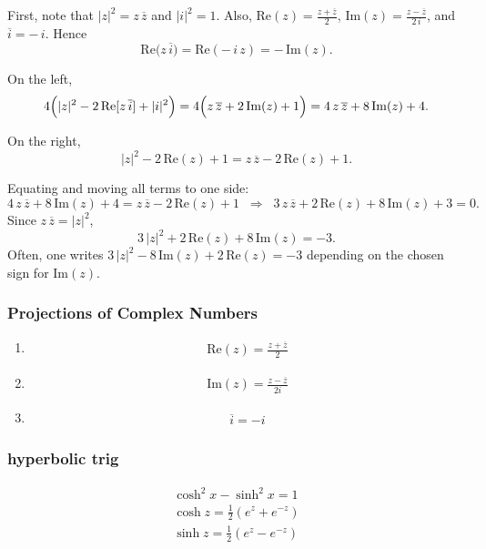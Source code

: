 \documentclass[9pt]{article}
\theoremstyle{definition} %
\theoremstyle{plain} %
\begin{document}
First, note that $\lvert z\rvert^{2} = z\,\overline{z}$ and $\lvert i\rvert^{2} = 1$.  
Also, $\mathrm{Re}(z) = \frac{z + \overline{z}}{2}$, $\mathrm{Im}(z) = \frac{z - \overline{z}}{2\,i}$, and $\overline{i} = -\,i$.  
Hence 
\[
\mathrm{Re}\bigl(z\,\overline{i}\bigr) 
= 
\mathrm{Re}(-\,i\,z) 
= 
-\,\mathrm{Im}(z).
\]

On the left, 
\[
4\Bigl(\lvert z\rvert^{2} - 2\,\mathrm{Re}[z\,\overline{i}] + \lvert i\rvert^{2}\Bigr)
=
4\Bigl(z\,\overline{z} + 2\,\mathrm{Im}(z) + 1\Bigr)
=
4\,z\,\overline{z} + 8\,\mathrm{Im}(z) + 4.
\]

On the right, 
\[
\lvert z\rvert^{2} - 2\,\mathrm{Re}(z) + 1
=
z\,\overline{z} - 2\,\mathrm{Re}(z) + 1.
\]

Equating and moving all terms to one side:
\[
4\,z\,\overline{z} + 8\,\mathrm{Im}(z) + 4
=
z\,\overline{z} - 2\,\mathrm{Re}(z) + 1
\;\;\Longrightarrow\;\;
3\,z\,\overline{z} + 2\,\mathrm{Re}(z) + 8\,\mathrm{Im}(z) + 3 
= 
0.
\]
Since $z\,\overline{z} = \lvert z\rvert^{2}$,
\[
3\,\lvert z\rvert^{2} + 2\,\mathrm{Re}(z) + 8\,\mathrm{Im}(z) = -3.
\]
Often, one writes
\(
3\,\lvert z\rvert^{2} - 8\,\mathrm{Im}(z) + 2\,\mathrm{Re}(z) = -3
\)
depending on the chosen sign for $\mathrm{Im}(z)$.
\subsubsection*{Projections of Complex Numbers}
\noindent
\begin{enumerate}
    \item \begin{align}
        \text{Re}(z) = \frac{z+\overline{z} }{2}
    \end{align}
    \item \begin{align}
        \text{Im} (z)= \frac{z-\overline{z} }{2i}
    \end{align}
    \item \begin{align}
        \overline{i} = -i
    \end{align}
\end{enumerate}

\subsubsection*{hyperbolic trig}
\begin{align}
    \cosh^{2}x-\sinh^{2}x=1 \\[10pt] 
    \cosh z = \frac{1}{2}(e^{z}+e^{-z}) \\[10pt] 
    \sinh z = \frac{1}{2}(e^{z}-e^{-z})
\end{align}
\end{document}
